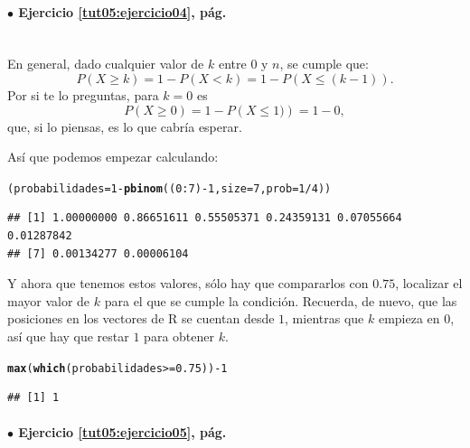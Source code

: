 \documentclass[10pt,a4paper]{article}\usepackage[]{graphicx}\usepackage[]{color}
\makeatletter
\newcommand{\hlnum}[1]{\textcolor[rgb]{0.686,0.059,0.569}{#1}}%
\newcommand{\hlopt}[1]{\textcolor[rgb]{0,0,0}{#1}}%
\newcommand{\hlstd}[1]{\textcolor[rgb]{0.345,0.345,0.345}{#1}}%
\newcommand{\hlkwb}[1]{\textcolor[rgb]{0.69,0.353,0.396}{#1}}%
\newcommand{\hlkwc}[1]{\textcolor[rgb]{0.333,0.667,0.333}{#1}}%
\newcommand{\hlkwd}[1]{\textcolor[rgb]{0.737,0.353,0.396}{\textbf{#1}}}%
\newenvironment{kframe}{%
 \def\at@end@of@kframe{}%
 \ifinner\ifhmode%
  \def\at@end@of@kframe{\end{minipage}}%
  \begin{minipage}{\columnwidth}%
 \fi\fi%
 \def\FrameCommand##1{\hskip\@totalleftmargin \hskip-\fboxsep
 \colorbox{shadecolor}{##1}\hskip-\fboxsep
     \hskip-\linewidth \hskip-\@totalleftmargin \hskip\columnwidth}%
 \MakeFramed {\advance\hsize-\width
   \@totalleftmargin\z@ \linewidth\hsize
   \@setminipage}}%
 {\par\unskip\endMakeFramed%
 \at@end@of@kframe}
\newenvironment{knitrout}{}{} %
\makeatother
\begin{document}
\paragraph{\bf $\bullet$ Ejercicio \ref{tut05:ejercicio04}, pág. \pageref{tut05:ejercicio04}}
\label{tut05:ejercicio04:sol}\quad\\

En general, dado cualquier valor de $k$ entre $0$ y $n$, se cumple que:
\[P(X\geq k) = 1 - P(X < k) = 1 - P\left(X \leq (k-1)\right).\]
Por si te lo preguntas, para $k=0$ es
\[P(X\geq 0) = 1 - P\left(X \leq 1)\right) = 1 - 0,\]
que, si lo piensas, es lo que cabría esperar.

Así que podemos empezar calculando:
\begin{knitrout}
\color{fgcolor}\begin{kframe}
\begin{alltt}
\hlstd{(probabilidades} \hlkwb{=} \hlnum{1}\hlopt{-} \hlkwd{pbinom}\hlstd{((}\hlnum{0}\hlopt{:}\hlnum{7}\hlstd{)}\hlopt{-}\hlnum{1}\hlstd{,} \hlkwc{size} \hlstd{=} \hlnum{7}\hlstd{,} \hlkwc{prob} \hlstd{=} \hlnum{1}\hlopt{/}\hlnum{4}\hlstd{))}
\end{alltt}
\begin{verbatim}
## [1] 1.00000000 0.86651611 0.55505371 0.24359131 0.07055664 0.01287842
## [7] 0.00134277 0.00006104
\end{verbatim}
\end{kframe}
\end{knitrout}
Y ahora que tenemos estos valores, sólo hay que compararlos con $0.75$, localizar el mayor valor de $k$ para el que se cumple la condición. Recuerda, de nuevo, que las posiciones en los vectores de R se cuentan desde $1$, mientras que $k$ empieza en $0$, así que hay que restar $1$ para obtener $k$.
\begin{knitrout}
\color{fgcolor}\begin{kframe}
\begin{alltt}
\hlkwd{max}\hlstd{(}\hlkwd{which}\hlstd{(probabilidades} \hlopt{>=} \hlnum{0.75}\hlstd{) )}\hlopt{-} \hlnum{1}
\end{alltt}
\begin{verbatim}
## [1] 1
\end{verbatim}
\end{kframe}
\end{knitrout}

\paragraph{\bf $\bullet$ Ejercicio \ref{tut05:ejercicio05}, pág. \pageref{tut05:ejercicio05}}
\label{tut05:ejercicio05:sol}\quad\\
\end{document}
